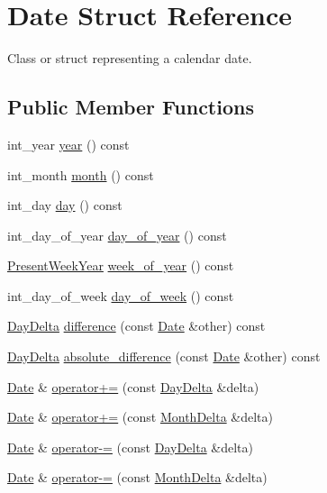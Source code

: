 \hypertarget{structDate}{\section{\-Date \-Struct \-Reference}
\label{structDate}
}


\-Class or struct representing a calendar date.  


\subsection*{\-Public \-Member \-Functions}
\begin{DoxyCompactItemize}
\item 
int\-\_\-year \hyperlink{structDate_aac4f4635d8db0ea1a32c2f979a1a6cc0}{year} () const 
\item 
int\-\_\-month \hyperlink{structDate_a39f4a9fd570f306025f78447477e42d6}{month} () const 
\item 
int\-\_\-day \hyperlink{structDate_ac4993265144899a83ee57cd6d54d3bff}{day} () const 
\item 
int\-\_\-day\-\_\-of\-\_\-year \hyperlink{structDate_aa1aaeb37af12be4ac07337b5e4ba8206}{day\-\_\-of\-\_\-year} () const 
\item 
\hyperlink{structPresentWeekYear}{\-Present\-Week\-Year} \hyperlink{structDate_af051f922cdc105f86b92fc6d8bbdfa90}{week\-\_\-of\-\_\-year} () const 
\item 
int\-\_\-day\-\_\-of\-\_\-week \hyperlink{structDate_ac85eed3a3b2d579cdc74b2af801740b0}{day\-\_\-of\-\_\-week} () const 
\item 
\hyperlink{structDayDelta}{\-Day\-Delta} \hyperlink{structDate_aaf5d0adf703c6d7d48f1742c320cb2b6}{difference} (const \hyperlink{structDate}{\-Date} \&other) const 
\item 
\hyperlink{structDayDelta}{\-Day\-Delta} \hyperlink{structDate_a99bd240acacbb056a0ece6cb604fb7e1}{absolute\-\_\-difference} (const \hyperlink{structDate}{\-Date} \&other) const 
\item 
\hyperlink{structDate}{\-Date} \& \hyperlink{structDate_a0d7e72cd689c957e981f64da5565c5cc}{operator+=} (const \hyperlink{structDayDelta}{\-Day\-Delta} \&delta)
\item 
\hyperlink{structDate}{\-Date} \& \hyperlink{structDate_a6a69c92d288794dc5f33647b7fb67d67}{operator+=} (const \hyperlink{structMonthDelta}{\-Month\-Delta} \&delta)
\item 
\hyperlink{structDate}{\-Date} \& \hyperlink{structDate_a4fd0dac9dc8aeb5dbd008717c6bc8974}{operator-\/=} (const \hyperlink{structDayDelta}{\-Day\-Delta} \&delta)
\item 
\hyperlink{structDate}{\-Date} \& \hyperlink{structDate_afe99434d7c9419d5505e9ba8ff599d05}{operator-\/=} (const \hyperlink{structMonthDelta}{\-Month\-Delta} \&delta)
\end{DoxyCompactItemize}
